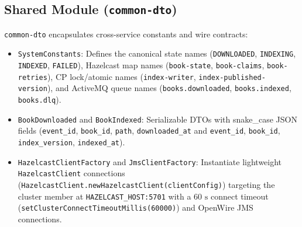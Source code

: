 \documentclass[10pt,a4paper]{article}
\begin{document}
\subsection{Shared Module (\texttt{common-dto})}
\texttt{common-dto} encapsulates cross-service constants and wire contracts:
\begin{itemize}[leftmargin=*,nosep]
    \item \texttt{SystemConstants}: Defines the canonical state names (\texttt{DOWNLOADED}, \texttt{INDEXING}, \texttt{INDEXED}, \texttt{FAILED}), Hazelcast map names (\texttt{book-state}, \texttt{book-claims}, \texttt{book-retries}), CP lock/atomic names (\texttt{index-writer}, \texttt{index-published-version}), and ActiveMQ queue names (\texttt{books.downloaded}, \texttt{books.indexed}, \texttt{books.dlq}).
    \item \texttt{BookDownloaded} and \texttt{BookIndexed}: Serializable DTOs with snake\_case JSON fields (\texttt{event\_id}, \texttt{book\_id}, \texttt{path}, \texttt{downloaded\_at} and \texttt{event\_id}, \texttt{book\_id}, \texttt{index\_version}, \texttt{indexed\_at}).
    \item \texttt{HazelcastClientFactory} and \texttt{JmsClientFactory}: Instantiate lightweight \texttt{HazelcastClient} connections (\texttt{HazelcastClient.newHazelcastClient(clientConfig)}) targeting the cluster member at \texttt{HAZELCAST\_HOST:5701} with a $60\text{ s}$ connect timeout (\texttt{setClusterConnectTimeoutMillis(60000)}) and OpenWire JMS connections.
\end{itemize}
\end{document}
